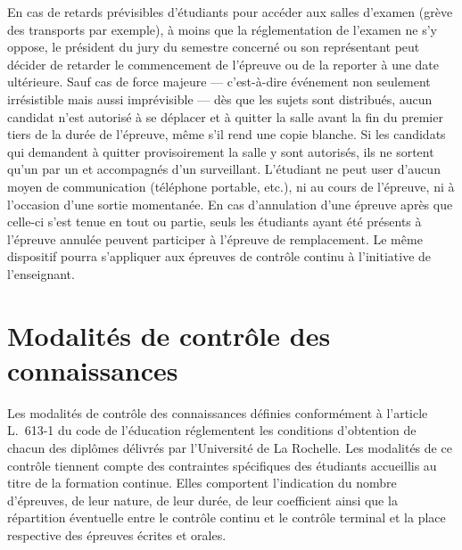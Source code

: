 \documentclass[a4paper,11pt]{article}
\begin{document}
En cas de retards prévisibles d'étudiants pour accéder aux salles d'examen (grève des transports par exemple), à moins que la réglementation de l'examen ne s'y oppose, le président du jury du semestre concerné ou son représentant peut décider de retarder le commencement de l'épreuve ou de la reporter à une date ultérieure.
Sauf cas de force majeure --- c'est-à-dire événement non seulement irrésistible mais aussi imprévisible --- dès que les sujets sont distribués, aucun candidat n'est autorisé à se déplacer et à quitter la salle avant la fin du premier tiers de la durée de l'épreuve, même s'il rend une copie blanche.
Si les candidats qui demandent à quitter provisoirement la salle y sont autorisés, ils ne sortent qu'un par un et accompagnés d'un surveillant.
L'étudiant ne peut user d'aucun moyen de communication (téléphone portable, etc.), ni au cours de l'épreuve, ni à l'occasion d'une sortie momentanée.
En cas d'annulation d'une épreuve après que celle-ci s'est tenue en tout ou partie, seuls les étudiants ayant été présents à l'épreuve annulée peuvent participer à l'épreuve de remplacement. Le même dispositif pourra s'appliquer aux épreuves de contrôle continu à l'initiative de l'enseignant.

\section{Modalités de contrôle des connaissances}
Les modalités de contrôle des connaissances définies conformément à l'article L.~613-1 du code de l'éducation réglementent les conditions d'obtention de chacun des diplômes délivrés par l'Université de La Rochelle. Les modalités de ce contrôle tiennent compte des contraintes spécifiques des étudiants accueillis au titre de la formation continue. Elles comportent l'indication du nombre d'épreuves, de leur nature, de leur durée, de leur coefficient ainsi que la répartition éventuelle entre le contrôle continu et le contrôle terminal et la place respective des épreuves écrites et orales.
\end{document}

